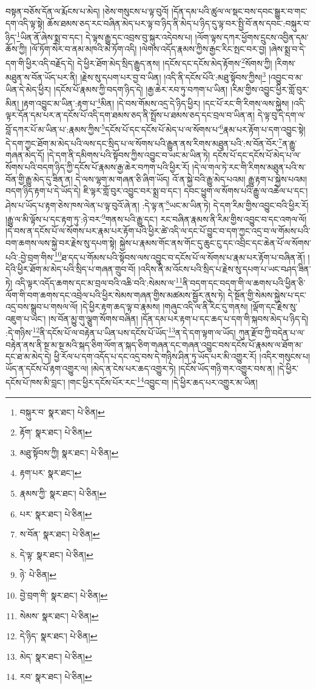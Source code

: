 བསྟན་བཅོས་དོན་ལ་རྨོངས་པ་མེད། །ཅེས་གསུངས་པ་ལྟ་བུའོ། །དོན་དམ་པའི་ཚུལ་ལ་སྡང་བས་དབང་སྒྱུར་བ་གང་དག་འདི་ལྟ་སྟེ། ཆོས་ཐམས་ཅད་རང་བཞིན་མེད་པར་ལྟ་བ་ཉིད་ནི་མེད་པ་ཉིད་དུ་ལྟ་བར་སྤྱི་བོ་ནས་དབང་:བསྐུར་བ་ཉིད་\footnote{བསྐུར་བ་  སྣར་ཐང་།  པེ་ཅིན། }ཡིན་ནོ་ཞེས་སྨྲ་བ་དང་། དེ་ལྟས་རྒྱུ་དང་འབྲས་བུ་སྐུར་འདེབས་པ། །ལོག་ལྟས་དཀར་ཕྱོགས་དྲུངས་འབྱིན་དམ་ཆོས་ཀྱི། །ལོ་ཏོག་སེར་བ་ནམ་མཁའི་མེ་ཏོག་འདི། །ལེགས་འདོད་རྣམས་ཀྱིས་རྒྱང་རིང་སྤང་བར་བྱ། །ཞེས་སྨྲ་བ་དེ་དག་གི་ཕྱིར་འདི་བརྗོད་དེ། དེ་ཕྱིར་ཐོག་མེད་སྲིད་རྒྱུད་ནས། །དངོས་དང་དངོས་མེད་རྟོགས་\footnote{རྟོག་  སྣར་ཐང་།  པེ་ཅིན། }སོགས་ཀྱི། །རིགས་མཐུན་ས་བོན་ཡོད་པར་ནི། །རྗེས་སུ་དཔག་པར་བྱ་བ་ཡིན། །འདི་ནི་དངོས་པོའི་:མཐུ་སྟོབས་ཀྱིས།\footnote{མཐུ་སྟོབས་ཀྱི།  སྣར་ཐང་།  པེ་ཅིན། } །འབྱུང་བ་མ་ཡིན་དེ་མེད་ཕྱིར། །དངོས་པོ་རྣམས་ཀྱི་བདག་ཉིད་དེ། །རྒྱ་ཆེར་རབ་ཏུ་བཀག་པ་ཡིན། །རིམ་གྱིས་འབྱུང་ཕྱིར་གློ་བུར་མིན། །རྟག་འབྱུང་མ་ཡིན་:རྟག་པ་\footnote{རྟག་པར་  སྣར་ཐང་། }མིན། །དེ་བས་གོམས་འདྲ་དེ་ཉིད་ཕྱིར། །དང་པོ་རང་གི་རིགས་ལས་སྐྱེས། །འདི་ལྟར་དོན་དམ་པར་ན་དངོས་པོ་འདི་དག་ཐམས་ཅད་ནི་སྤྲོས་པ་ཐམས་ཅད་དང་བྲལ་བ་ཡིན་ན། དེ་ལྟ་བུ་དེ་དག་ལ་བློ་དཀར་པོ་མ་ཡིན་པ་:རྣམས་ཀྱིས་\footnote{རྣམས་ཀྱི་  སྣར་ཐང་།  པེ་ཅིན། }དངོས་པོ་དང་དངོས་པོ་མེད་པ་ལ་སོགས་པ་\footnote{པར་  སྣར་ཐང་།  པེ་ཅིན། }རྣམ་པར་རྟོག་པ་དག་འབྱུང་སྟེ། དེ་དག་ཀྱང་ཐོག་མ་མེད་པའི་ལས་དང་སྲིད་པ་ལ་སོགས་པའི་རྒྱུན་ནས་རིགས་མཐུན་པའི་:ས་བོན་བོར་\footnote{ས་བོན་  སྣར་ཐང་།  པེ་ཅིན། }ན་རྒྱུ་གཞན་མེད་དོ། །དེ་དག་ནི་དམིགས་པའི་སྟོབས་ཀྱིས་འབྱུང་བ་ཡང་མ་ཡིན་ཏེ། དངོས་པོ་དང་དངོས་པོ་མེད་པ་ལ་སོགས་པའི་བདག་ཉིད་ཀྱི་དངོས་པོ་རྣམས་རྒྱ་ཆེར་བཀག་པའི་ཕྱིར་རོ། །དེ་ལ་གལ་ཏེ་རང་གི་རིགས་མཐུན་པའི་ས་བོན་གྱི་རྒྱུ་མེད་དུ་ཟིན་ན། དེ་ལས་ལྷག་མ་གཞན་ཅི་ཞིག་ཡོད། འོ་ན་སྐྱེ་བའི་རྒྱུ་མེད་པའམ། རྒྱུ་རྟག་པ་སྐྱེས་པའམ། བདག་ཉིད་རྟག་པ་དེ་ཡོད་དེ། ཇི་ལྟར་གློ་བུར་འབྱུང་བར་སྨྲ་བ་དང་། དབང་ཕྱུག་ལ་སོགས་པའི་རྒྱུ་ལ་འཆེལ་པ་དང་། ཤེས་པ་ཡོད་པ་རྟག་ཅེས་ཁས་ལེན་པ་ལྟ་བུའོ་ཞེ་ན། :དེ་ལྟ་ན་\footnote{དེ་ལྟ་  སྣར་ཐང་།  པེ་ཅིན། }ཡང་མ་ཡིན་ཏེ། དེ་དག་རིམ་གྱིས་འབྱུང་བའི་ཕྱིར་རོ། །རྒྱུ་ལ་མི་ལྟོས་པ་དང་རྟག་ཏུ་:ཉེ་བར་\footnote{ཉེ་  པེ་ཅིན། }གནས་པའི་རྒྱུ་དང་། རང་བཞིན་རྣམས་ནི་རིམ་གྱིས་འབྱུང་བ་དང་འགལ་ལོ། །དེ་བས་ན་དངོས་པོ་ལ་སོགས་པར་རྣམ་པར་རྟོག་པའི་ཕྱིར་ཚེ་འདི་ལ་དང་པོ་བྱུང་བ་དག་ཀྱང་འདྲ་བ་ལ་གོམས་པའི་བག་ཆགས་ལས་སྐྱེ་བར་རྗེས་སུ་དཔག་སྟེ། སྐྱེས་པ་རྣམས་གོང་ནས་གོང་དུ་ཆུང་ངུ་དང་འབྲིང་དང་ཆེན་པོ་ལ་སོགས་པའི་:བྱེ་བྲག་གིས་\footnote{བྱེ་བྲག་གི་  སྣར་ཐང་།  པེ་ཅིན། }ཐ་དད་པ་གོམས་པའི་སྟོབས་ལས་འབྱུང་བ་དངོས་པོ་ལ་སོགས་པ་རྣམ་པར་རྟོག་པ་བཞིན་ནོ། །དེའི་ཕྱིར་ཐོག་མ་མེད་པའི་སྲིད་པ་གཞན་གྲུབ་བོ། །འདིས་ནི་མ་འོངས་པའི་སྲིད་པ་རྗེས་སུ་དཔག་པ་ཡང་བཤད་ཟིན་ཏེ། འདི་ལྟར་འདོད་ཆགས་དང་མ་བྲལ་བའི་འཆི་བའི་:སེམས་ལ་\footnote{སེམས་  སྣར་ཐང་།  པེ་ཅིན། }ནི་བདག་དང་བདག་གི་ལ་ཆགས་པའི་ཕྱིན་ཅི་ལོག་གི་བག་ཆགས་དང་འབྲེལ་པའི་ཕྱིར་སེམས་གཞན་གྱིས་མཚམས་སྦྱོར་ནུས་ཏེ། དེ་སྔོན་གྱི་སེམས་སྐྱེས་པ་དང་འདྲ་བས་སྒྲུབ་པ་གསལ་ལོ། །དེ་ཕྱིར་རྟག་ཆད་ལྟ་བ་རྣམས། །གཞུང་འདི་ལ་ནི་རིང་དུ་གནས། །ལྡོག་དང་རྗེས་སུ་འཇུག་པ་ཡང་། །ས་བོན་མྱུ་གུ་ལྕུག་སོགས་བཞིན། །དོན་དམ་པར་རྟག་པ་དང་ཆད་པ་དག་གི་སྐབས་མེད་པ་ཉིད་དེ། :དེ་གཉིས་\footnote{དེ་ཉིད་  སྣར་ཐང་།  པེ་ཅིན། }ནི་དངོས་པོ་ལ་བརྟེན་པ་ཡིན་པས་དངོས་པོ་ཡོད་\footnote{མེད་  སྣར་ཐང་།  པེ་ཅིན། }ན་དེ་དག་ལྟག་ལ་ཡོད། ཀུན་རྫོབ་ཀྱི་བདེན་པ་ལ་བརྟེན་ནས་ནི་སྔ་མ་སྔ་མའི་སྐད་ཅིག་ལོག་ན་སྐད་ཅིག་གཞན་དང་གཞན་འབྱུང་བས་དངོས་པོ་རྣམས་ལ་ཐོག་མ་དང་ཐ་མ་མེད་དེ། ཕྱི་རོལ་པ་དག་འདོད་པ་དང་འདྲ་བས་དེ་གཉིས་ཤིན་ཏུ་ཡོད་པར་མི་འགྱུར་རོ། །འདིར་གསུངས་པ། ཡོད་ན་དངོས་པོ་རྟག་འགྱུར་ལ། །མེད་ན་ངེས་པར་ཆད་འགྱུར་ཏེ། །དངོས་ཡོད་གཉི་གར་འགྱུར་བས་ན། །དེ་ཕྱིར་དངོས་པོ་ཁས་མི་བླང་། །གང་ཕྱིར་དངོས་པོར་རང་\footnote{རབ་  སྣར་ཐང་།  པེ་ཅིན། }འབྱུང་བ། །དེ་ཕྱིར་ཆད་པར་འགྱུར་མ་ཡིན། 